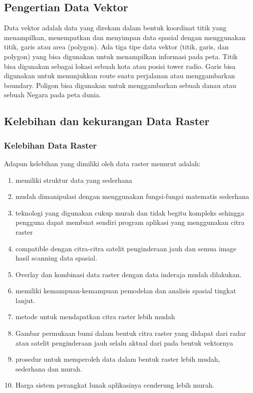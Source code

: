 \subsection{Pengertian Data Vektor}
Data vektor adalah data yang direkam dalam bentuk koordinat titik yang menampilkan, 
menempatkan dan menyimpan data spasial dengan menggunakan titik, 
garis atau area (polygon). Ada tiga tipe data vektor (titik, garis, 
dan polygon) yang bisa digunakan untuk menampilkan informasi pada peta. 
Titik bisa digunakan sebagai lokasi sebuah kota atau posisi tower radio. 
Garis bisa digunakan untuk menunjukkan route suatu perjalanan atau menggambarkan boundary. 
Poligon bisa digunakan untuk menggambarkan sebuah danau atau sebuah Negara pada peta dunia.

\subsection{Kelebihan dan kekurangan Data Raster}
\subsubsection{Kelebihan Data Raster}
Adapun kelebihan yang dimiliki oleh data raster menurut \cite{irwansyah2013sistem} adalah: 
	\begin{enumerate}
		\item memiliki struktur data yang sederhana
		\item mudah dimanipulasi dengan menggunakan fungsi-fungsi matematis sederhana
		\item teknologi yang digunakan cukup murah dan tidak begitu kompleks sehingga pengguna dapat membuat sendiri program aplikasi yang menggunakan citra raster
		\item compatible dengan citra-citra satelit penginderaan jauh dan semua image hasil scanning data spasial.
		\item Overlay dan kombinasi data raster dengan data inderaja mudah dilakukan.
		\item memiliki kemampuan-kemampuan pemodelan dan analisis  spasial tingkat lanjut.
		\item metode untuk mendapatkan citra raster lebih mudah
		\item Gambar permukaan bumi dalam bentuk citra raster yang didapat dari radar atau satelit penginderaan jauh selalu aktual dari pada bentuk vektornya
		\item prosedur untuk memperoleh data dalam bentuk raster lebih mudah, sederhana dan murah.
		\item Harga sistem perangkat lunak aplikasinya cenderung lebih murah.
	\end{enumerate}

